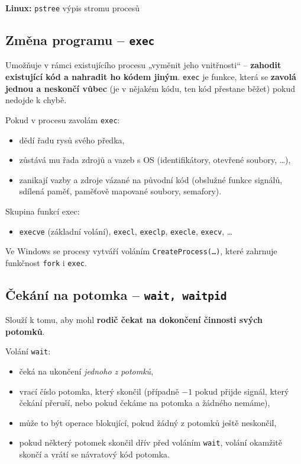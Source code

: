 \documentclass[a4paper, 11pt]{article}
\newcommand{\tcmd}[1]{\texttt{#1}}
\begin{document}
\textbf{Linux:}
\tcmd{pstree} výpis stromu procesů

\subsection{Změna programu -- \tcmd{exec}}
Umožňuje v rámci existujícího procesu „vyměnit jeho vnitřnosti“ -- \textbf{zahodit existující kód a nahradit ho kódem jiným}. \tcmd{exec} je funkce, která se \textbf{zavolá jednou a neskončí vůbec} (je v nějakém kódu, ten kód přestane běžet) pokud nedojde k chybě.
 
Pokud v procesu zavolám \tcmd{exec}:
\begin{itemize}
    \item dědí řadu rysů svého předka,
    \item zůstává mu řada zdrojů a vazeb s OS (identifikátory, otevřené soubory, \ldots),
    \item zanikají vazby a zdroje vázané na původní kód (obslužné funkce signálů, sdílená paměť, paměťově mapované soubory, semafory).
\end{itemize}
 
Skupina funkcí exec:
\begin{itemize}
    \item \tcmd{execve} (základní volání), \tcmd{execl}, \tcmd{execlp}, \tcmd{execle}, \tcmd{execv}, \ldots
\end{itemize}
 
Ve Windows se procesy vytváří voláním \tcmd{CreateProcess(\ldots)}, které zahrnuje funkčnost \tcmd{fork} i \tcmd{exec}.

\subsection{Čekání na potomka -- \tcmd{wait, waitpid}}
Slouží k tomu, aby mohl \textbf{rodič čekat na dokončení činnosti svých potomků}.

Volání \tcmd{wait}:
\begin{itemize}
 \item čeká na ukončení \emph{jednoho z potomků},
 \item vrací číslo potomka, který skončil (případně $-1$ pokud přijde signál, který čekání přeruší, nebo pokud čekáme na potomka a žádného nemáme),
 \item může to být operace blokující, pokud žádný z potomků ještě neskončil, 
 \item pokud některý potomek skončil dřív před voláním \tcmd{wait}, volání okamžitě skončí a vrátí se návratový kód potomka.
\end{itemize}
\end{document}
